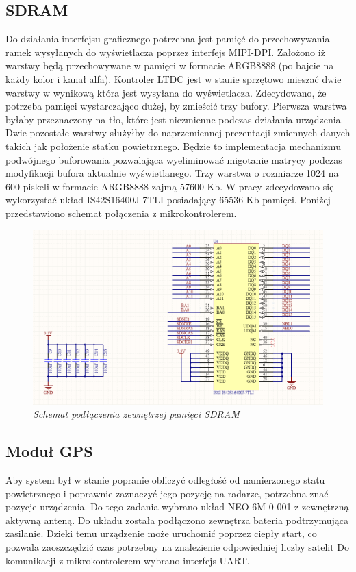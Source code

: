 \documentclass[eng,printmode]{mgr}
\begin{document}
\subsection{SDRAM}
Do działania interfejsu graficznego potrzebna jest pamięć do przechowywania ramek wysyłanych do wyświetlacza poprzez interfejs MIPI-DPI. Założono iż warstwy będą przechowywane w pamięci w formacie ARGB8888 (po bajcie na każdy kolor i kanał alfa). Kontroler LTDC jest w stanie sprzętowo mieszać dwie warstwy w wynikową która jest wysyłana do wyświetlacza. Zdecydowano, że potrzeba pamięci wystarczająco dużej, by zmieścić trzy bufory. Pierwsza warstwa byłaby przeznaczony na tło, które jest niezmienne podczas działania urządzenia. Dwie pozostałe warstwy służyłby do naprzemiennej prezentacji zmiennych danych takich jak położenie statku powietrznego. Będzie to implementacja mechanizmu podwójnego buforowania pozwalająca wyeliminować migotanie matrycy podczas modyfikacji bufora aktualnie wyświetlanego. Trzy warstwa o rozmiarze 1024 na 600 piskeli w formacie ARGB8888 zajmą 57600 Kb. W pracy zdecydowano się wykorzystać układ IS42S16400J-7TLI posiadający 65536 Kb pamięci. Poniżej przedstawiono schemat połączenia z mikrokontrolerem.

\begin{figure}[!h]
    \centering
    \includegraphics[width=\textwidth]{schematics/sdram.png}
    \caption{\textit{\scriptsize Schemat podłączenia zewnętrzej pamięci SDRAM}}
\end{figure}

\subsection{Moduł GPS}
Aby system był w stanie popranie obliczyć odległość od namierzonego statu powietrznego i poprawnie zaznaczyć jego pozycję na radarze, potrzebna znać pozycje urządzenia. Do tego zadania wybrano układ NEO-6M-0-001 z zewnętrzną aktywną anteną. Do układu została podłączono zewnętrza bateria podtrzymująca zasilanie. Dzieki temu urządzenie może uruchomić poprzez ciepły start, co pozwala zaoszczędzić czas potrzebny na znalezienie odpowiedniej liczby satelit Do komunikacji z mikrokontrolerem wybrano interfejs UART.
\end{document}
